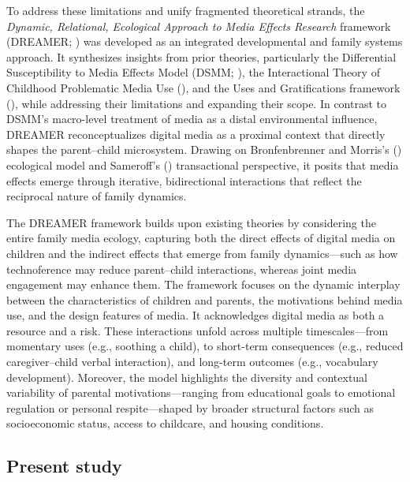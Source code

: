 \documentclass[
  man,
  floatsintext,
  longtable,
  nolmodern,
  notxfonts,
  notimes,
  colorlinks=true,linkcolor=blue,citecolor=blue,urlcolor=blue]{apa7}
\begin{document}
To address these limitations and unify fragmented theoretical strands,
the \emph{Dynamic, Relational, Ecological Approach to Media Effects
Research} framework (DREAMER;
) was
developed as an integrated developmental and family systems approach. It
synthesizes insights from prior theories, particularly the Differential
Susceptibility to Media Effects Model (DSMM;
), the Interactional Theory of Childhood Problematic
Media Use (), and the Uses and Gratifications framework
(), while
addressing their limitations and expanding their scope. In contrast to
DSMM's macro-level treatment of media as a distal environmental
influence, DREAMER reconceptualizes digital media as a proximal context
that directly shapes the parent--child microsystem. Drawing on
Bronfenbrenner and Morris's
()
ecological model and Sameroff's
()
transactional perspective, it posits that media effects emerge through
iterative, bidirectional interactions that reflect the reciprocal nature
of family dynamics.

The DREAMER framework builds upon existing theories by considering the
entire family media ecology, capturing both the direct effects of
digital media on children and the indirect effects that emerge from
family dynamics---such as how technoference may reduce parent--child
interactions, whereas joint media engagement may enhance them. The
framework focuses on the dynamic interplay between the characteristics
of children and parents, the motivations behind media use, and the
design features of media. It acknowledges digital media as both a
resource and a risk. These interactions unfold across multiple
timescales---from momentary uses (e.g., soothing a child), to short-term
consequences (e.g., reduced caregiver--child verbal interaction), and
long-term outcomes (e.g., vocabulary development). Moreover, the model
highlights the diversity and contextual variability of parental
motivations---ranging from educational goals to emotional regulation or
personal respite---shaped by broader structural factors such as
socioeconomic status, access to childcare, and housing conditions.

\subsection{Present study}\label{present-study}
\end{document}
